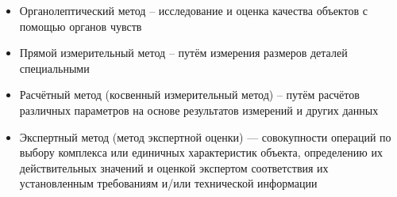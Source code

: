 \begin{itemize}
\item  Органолептический метод – исследование и оценка качества объектов с помощью органов чувств
\item 	Прямой измерительный метод – путём измерения размеров деталей специальными %
\item Расчётный метод (косвенный измерительный метод) – путём расчётов различных параметров на основе результатов измерений и других данных
\item Экспертный метод (метод экспертной оценки) — совокупности операций по выбору комплекса или единичных характеристик объекта, определению их действительных значений и оценкой экспертом соответствия их установленным требованиям и/или технической информации

\end{itemize}
%
